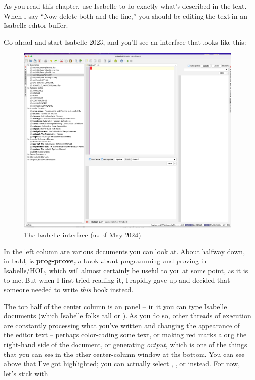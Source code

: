 \task
As you read this chapter, use Isabelle to do exactly what's described in the text. When I say ``Now delete both  and the  line,'' you should be editing the text in an Isabelle editor-buffer. 
\etask

Go ahead and start Isabelle 2023, and you'll see an interface that looks like this:
\begin{figure}[h]
    \centering
    \includegraphics[width=0.7\linewidth]{TEXT//C01//Images/interface.png}
    \caption{The Isabelle interface (as of May 2024)}
    \label{fig:C1-interface}
\end{figure}
In the left column are various documents you can look at. About halfway down, in bold, is \textbf{prog-prove}\textit{\textbf{,}} a book about programming and proving in Isabelle/HOL, which will almost certainly be useful to you at some point, as it is to me. But when I first tried reading it, I rapidly gave up and decided that someone needed to write \textit{this} book instead. 


The top half of the center column is an  panel -- in it you can type Isabelle documents (which Isabelle folks call  or ). As you do so, other threads of execution are constantly processing what you've written and changing the appearance of the editor text -- perhaps color-coding some text, or making red marks along the right-hand side of the document, or generating \textit{output}, which is one of the things that you can see in the other center-column window at the bottom. You can see above that I've got  highlighted; you can actually select , , or  instead. For now, let's stick with . 

